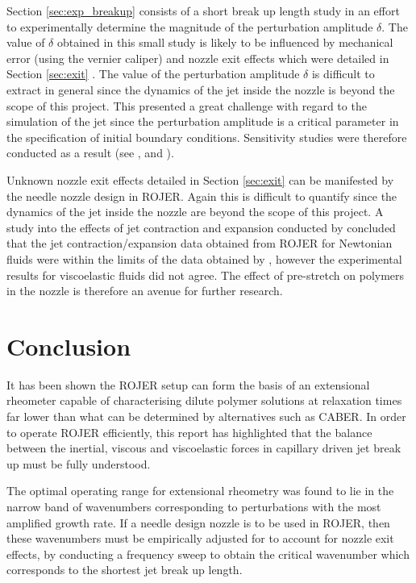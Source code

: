 \documentclass[11pt]{article}
\begin{document}
Section \ref{sec:exp_breakup} consists of a short break up length study in an 
effort to experimentally determine the magnitude of the perturbation amplitude 
$\delta$. The value of $\delta$ obtained in this small study is likely to be 
influenced by mechanical error (using the vernier caliper) and nozzle exit 
effects which were detailed in Section \ref{sec:exit} . The value of the 
perturbation amplitude $\delta$ is difficult to extract in general since the 
dynamics of the jet inside the nozzle is beyond the scope of this project. This 
presented a great challenge with regard to the simulation of the jet since the 
perturbation amplitude is a critical parameter in the specification of initial 
boundary conditions. Sensitivity studies were therefore conducted as a result 
(see \cite{gorbatenko2015report}, \cite{greiciunas2015report} and 
\cite{hall2015report}).

Unknown nozzle exit effects detailed in Section \ref{sec:exit} can  be 
manifested by the needle nozzle design in ROJER. Again this is difficult to 
quantify since the dynamics of the jet inside the nozzle are beyond the scope 
of this project. A study into the effects of jet contraction and expansion 
conducted by \cite{greiciunas2015report} concluded that the jet 
contraction/expansion data obtained from ROJER for Newtonian fluids were within 
the limits of the data obtained by \cite{middleman1961expansion}, however the 
experimental results for viscoelastic fluids did not agree. The effect of 
pre-stretch on polymers in the nozzle is therefore an avenue for further 
research. 

\newpage

\section{Conclusion}

It has been shown the ROJER setup can form the basis of an extensional 
rheometer capable of characterising dilute polymer solutions at relaxation 
times far lower than what can be determined by alternatives such as CABER. In 
order to operate ROJER efficiently, this report has highlighted that the 
balance between the inertial, viscous and viscoelastic forces in capillary 
driven jet break up must be fully understood.

The optimal operating range for extensional rheometry was found to lie in the 
narrow band of wavenumbers corresponding to perturbations with the most 
amplified growth rate. If a needle design nozzle is to be used in ROJER, then 
these wavenumbers must be empirically adjusted for to account for nozzle exit 
effects, by conducting a frequency sweep to obtain the critical wavenumber 
which corresponds to the shortest jet break up length.
\end{document}
